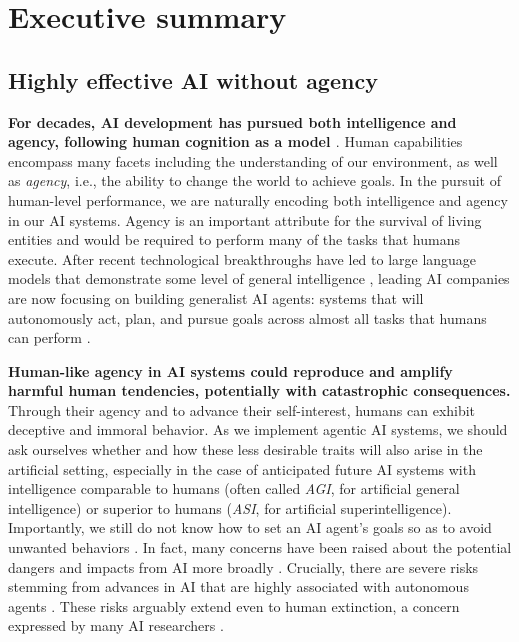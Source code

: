 
\section{Executive summary}
\label{sec:intro}
\subsection{Highly effective AI without agency}

\textbf{For decades, AI development has pursued both intelligence and agency, following human cognition as a model \cite{www.nature.com.articles.nature14539}}. Human capabilities encompass many facets including the understanding of our environment, as well as \emph{agency}, i.e., the ability to change the world to achieve goals. In the pursuit of human-level performance, we are naturally encoding both intelligence and agency in our AI systems. Agency is an important attribute for the survival of living entities and would be required to perform many of the tasks that humans execute. After recent technological breakthroughs have led to large language models that demonstrate some level of general intelligence \cite{dl.acm.org.doi.abs.10.5555.3495724.3495883}, leading AI companies are now focusing on building generalist AI agents: systems that will autonomously act, plan, and pursue goals across almost all tasks that humans can perform \cite{openreview.net.forum.id.1ikK0kHjvj,openai.com.index.introducing.operator}.

\textbf{Human-like agency in AI systems could reproduce and amplify harmful human tendencies, potentially with catastrophic consequences.} Through their agency and to advance their self-interest, humans can exhibit deceptive and immoral behavior. As we implement agentic AI systems, we should ask ourselves whether and how these less desirable traits will also arise in the artificial setting, especially in the case of anticipated future AI systems with intelligence comparable to humans (often called \emph{AGI}, for artificial general intelligence) or superior to humans (\emph{ASI}, for artificial superintelligence). Importantly, we still do not know how to set an AI agent's goals so as to avoid unwanted behaviors \cite{arxiv.org.abs.2109.13916,openreview.net.forum.id.fh8EYKFKns}. In fact, many concerns have been raised about the potential dangers and impacts from AI more broadly \cite{www.gov.uk.government.publications.international.ai.safety.report.2025}. Crucially, there are severe risks stemming from advances in AI that are highly associated with autonomous agents \cite{dl.acm.org.doi.10.5555.1566174.1566226, link.springer.com.article.10.1007.s11023.012.9281.3,arxiv.org.abs.2206.13353,www.aisafetybook.com.textbook.rogue.ai,arxiv.org.abs.2006.04948}. These risks arguably extend even to human extinction, a concern expressed by many AI researchers \cite{www.safe.ai.work.statement.on.ai.risk,arxiv.org.abs.2401.02843}.

